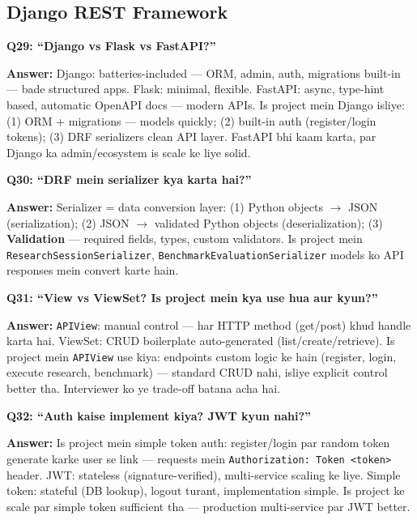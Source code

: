 \subsection{Django REST Framework}

\begin{interviewbox}
\textbf{Q29: ``Django vs Flask vs FastAPI?''}

\textbf{Answer:} Django: batteries-included --- ORM, admin, auth, migrations built-in --- bade structured apps. Flask: minimal, flexible. FastAPI: async, type-hint based, automatic OpenAPI docs --- modern APIs. Is project mein Django isliye: (1) ORM + migrations --- models quickly; (2) built-in auth (register/login tokens); (3) DRF serializers clean API layer. FastAPI bhi kaam karta, par Django ka admin/ecosystem is scale ke liye solid.
\end{interviewbox}

\begin{interviewbox}
\textbf{Q30: ``DRF mein serializer kya karta hai?''}

\textbf{Answer:} Serializer = data conversion layer: (1) Python objects $\rightarrow$ JSON (serialization); (2) JSON $\rightarrow$ validated Python objects (deserialization); (3) \textbf{Validation} --- required fields, types, custom validators. Is project mein \texttt{ResearchSessionSerializer}, \texttt{BenchmarkEvaluationSerializer} models ko API responses mein convert karte hain.
\end{interviewbox}

\begin{interviewbox}
\textbf{Q31: ``View vs ViewSet? Is project mein kya use hua aur kyun?''}

\textbf{Answer:} \texttt{APIView}: manual control --- har HTTP method (get/post) khud handle karta hai. ViewSet: CRUD boilerplate auto-generated (list/create/retrieve). Is project mein \texttt{APIView} use kiya: endpoints custom logic ke hain (register, login, execute research, benchmark) --- standard CRUD nahi, isliye explicit control better tha. Interviewer ko ye trade-off batana acha hai.
\end{interviewbox}

\begin{interviewbox}
\textbf{Q32: ``Auth kaise implement kiya? JWT kyun nahi?''}

\textbf{Answer:} Is project mein simple token auth: register/login par random token generate karke user se link --- requests mein \texttt{Authorization: Token <token>} header. JWT: stateless (signature-verified), multi-service scaling ke liye. Simple token: stateful (DB lookup), logout turant, implementation simple. Is project ke scale par simple token sufficient tha --- production multi-service par JWT better.
\end{interviewbox}

